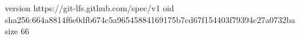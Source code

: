 version https://git-lfs.github.com/spec/v1
oid sha256:664a8814f6e0dfb674c5a96545884169175b7cd67f154403f79394c27a0732ba
size 66
